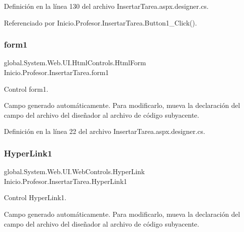Definición en la línea 130 del archivo Insertar\+Tarea.\+aspx.\+designer.\+cs.



Referenciado por Inicio.\+Profesor.\+Insertar\+Tarea.\+Button1\+\_\+\+Click().

\mbox{\label{classInicio_1_1Profesor_1_1InsertarTarea_aebf7c8c1c98ab0bbc64bb07e70ebcd4e}} 
\subsubsection{\texorpdfstring{form1}{form1}}
{\footnotesize\ttfamily global.\+System.\+Web.\+U\+I.\+Html\+Controls.\+Html\+Form Inicio.\+Profesor.\+Insertar\+Tarea.\+form1\hspace{0.3cm}{\ttfamily [protected]}}



Control form1. 

Campo generado automáticamente. Para modificarlo, mueva la declaración del campo del archivo del diseñador al archivo de código subyacente. 

Definición en la línea 22 del archivo Insertar\+Tarea.\+aspx.\+designer.\+cs.

\mbox{\label{classInicio_1_1Profesor_1_1InsertarTarea_a9fcee3b5754dbdeb1c274af936db3c13}} 
\subsubsection{\texorpdfstring{HyperLink1}{HyperLink1}}
{\footnotesize\ttfamily global.\+System.\+Web.\+U\+I.\+Web\+Controls.\+Hyper\+Link Inicio.\+Profesor.\+Insertar\+Tarea.\+Hyper\+Link1\hspace{0.3cm}{\ttfamily [protected]}}



Control Hyper\+Link1. 

Campo generado automáticamente. Para modificarlo, mueva la declaración del campo del archivo del diseñador al archivo de código subyacente. 

